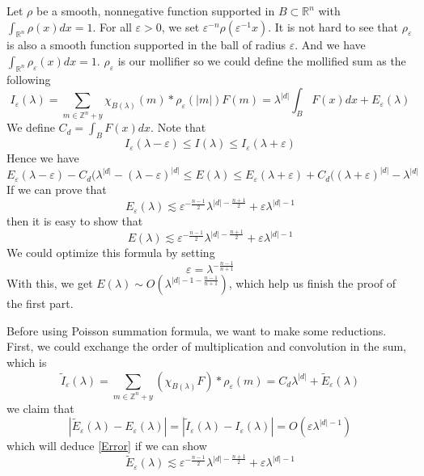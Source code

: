 \documentclass[10pt]{amsart}
\renewcommand{\epsilon}{\varepsilon}
\renewcommand{\epsilon}{\varepsilon}
\newcommand{\R}{{\mathbb R}}
\newcommand{\1}{\mathbb{1}}
\newcommand{\Z}{{\mathbb Z}}
\begin{document}
    Let $\rho$ be a smooth, nonnegative function supported in $B \subset \R^n$ with $\int_{\R^n}\rho(x)dx =1 $. For all $\epsilon > 0$, we set $\epsilon^{-n}\rho(\epsilon^{-1}x)$. It is not hard to see that $\rho_{\epsilon}$ is also a smooth function supported in the ball of radius $\epsilon$. And we have $\int_{\R^n}\rho_{\epsilon}(x)dx =1$. $\rho_{\epsilon}$ is our mollifier so we could define the mollified sum as the following
    \[
    I_{\epsilon} (\lambda) = \sum_{m \in \Z^n + y } \chi_{B(\lambda)}(m)*\rho_{\epsilon}(|m|)F(m) = \lambda^{|d|}\int_B F(x)dx +E_{\epsilon}(\lambda)
    \]
    We define $C_d = \int_B F(x)dx$. Note that 
    \[
    I_{\epsilon}(\lambda -\epsilon) \leq I(\lambda) \leq I_{\epsilon}(\lambda+\epsilon)
    \]
    Hence we have 
    \[
    E_{\epsilon}(\lambda-\epsilon) - C_d(\lambda^{|d|} - (\lambda -\epsilon)^{|d|} \leq E(\lambda) \leq  E_{\epsilon}(\lambda+\epsilon) + C_d((\lambda+\epsilon)^{|d|} - \lambda^{|d|}
    \]
    If we can prove that 
    \begin{equation}\label{Error}
        E_{\epsilon}(\lambda) \lesssim \epsilon^{-\frac{n-1}{2}} \lambda^{|d| - \frac{n+1}{2}} + \epsilon\lambda^{|d|-1}
    \end{equation}
    then it is easy to show that
    \begin{equation}
        E(\lambda) \lesssim \epsilon^{-\frac{n-1}{2}} \lambda^{|d| - \frac{n+1}{2}} + \epsilon\lambda^{|d|-1}
    \end{equation}
    We could optimize this formula by setting 
    \begin{equation}
        \epsilon = \lambda ^{-\frac{n-1}{n+1}}
    \end{equation}
    With this, we get $E(\lambda) \sim O(\lambda^{|d|-1-\frac{n-1}{n+1}})$, which help us finish the proof of the first part.

    Before using Poisson summation formula, we want to make some reductions. First, we could exchange the order of multiplication and convolution in the sum, which is 
    \[
    \tilde{I}_{\epsilon} (\lambda) = \sum_{m \in \Z^n + y } (\chi_{B(\lambda)}F)*\rho_{\epsilon}(m) = C_d\lambda^{|d|} +\tilde{E}_{\epsilon}(\lambda)
    \]
    we claim that
    \begin{equation}\label{Error2}
        |\tilde{E}_{\epsilon}(\lambda) - E_{\epsilon}(\lambda)|= |\tilde{I}_{\epsilon} (\lambda) -I_{\epsilon} (\lambda)| = O(\epsilon\lambda^{|d|-1})
    \end{equation}
    which will deduce \eqref{Error} if we can show 
    \begin{equation}
        \tilde{E}_{\epsilon}(\lambda) \lesssim \epsilon^{-\frac{n-1}{2}} \lambda^{|d| - \frac{n+1}{2}} + \epsilon\lambda^{|d|-1}
    \end{equation}
\end{document}

